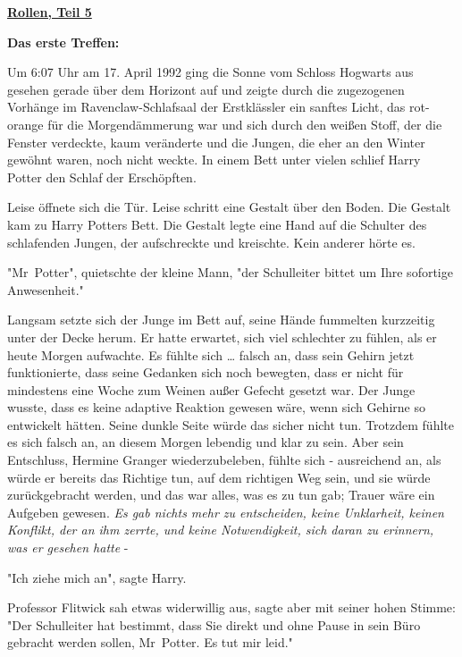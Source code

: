 

\hypertarget{rollen-teil-5}{%

\textbf{\uline{Rollen, Teil 5}}

\textbf{Das erste Treffen:}

Um 6:07 Uhr am 17. April 1992 ging die Sonne vom Schloss Hogwarts aus gesehen gerade über dem Horizont auf und zeigte durch die zugezogenen Vorhänge im Ravenclaw-Schlafsaal der Erstklässler ein sanftes Licht, das rot-orange für die Morgendämmerung war und sich durch den weißen Stoff, der die Fenster verdeckte, kaum veränderte und die Jungen, die eher an den Winter gewöhnt waren, noch nicht weckte. In einem Bett unter vielen schlief Harry Potter den Schlaf der Erschöpften.

Leise öffnete sich die Tür. Leise schritt eine Gestalt über den Boden. Die Gestalt kam zu Harry Potters Bett. Die Gestalt legte eine Hand auf die Schulter des schlafenden Jungen, der aufschreckte und kreischte. Kein anderer hörte es.

"Mr~Potter", quietschte der kleine Mann, "der Schulleiter bittet um Ihre sofortige Anwesenheit."

Langsam setzte sich der Junge im Bett auf, seine Hände fummelten kurzzeitig unter der Decke herum. Er hatte erwartet, sich viel schlechter zu fühlen, als er heute Morgen aufwachte. Es fühlte sich … falsch an, dass sein Gehirn jetzt funktionierte, dass seine Gedanken sich noch bewegten, dass er nicht für mindestens eine Woche zum Weinen außer Gefecht gesetzt war. Der Junge wusste, dass es keine adaptive Reaktion gewesen wäre, wenn sich Gehirne so entwickelt hätten. Seine dunkle Seite würde das sicher nicht tun. Trotzdem fühlte es sich falsch an, an diesem Morgen lebendig und klar zu sein. Aber sein Entschluss, Hermine Granger wiederzubeleben, fühlte sich - ausreichend an, als würde er bereits das Richtige tun, auf dem richtigen Weg sein, und sie würde zurückgebracht werden, und das war alles, was es zu tun gab; Trauer wäre ein Aufgeben gewesen. \emph{Es gab nichts mehr zu entscheiden, keine Unklarheit, keinen Konflikt, der an ihm zerrte, und keine Notwendigkeit, sich daran zu erinnern, was er gesehen hatte} -

"Ich ziehe mich an", sagte Harry.

Professor Flitwick sah etwas widerwillig aus, sagte aber mit seiner hohen Stimme: "Der Schulleiter hat bestimmt, dass Sie direkt und ohne Pause in sein Büro gebracht werden sollen, Mr~Potter. Es tut mir leid."

}

